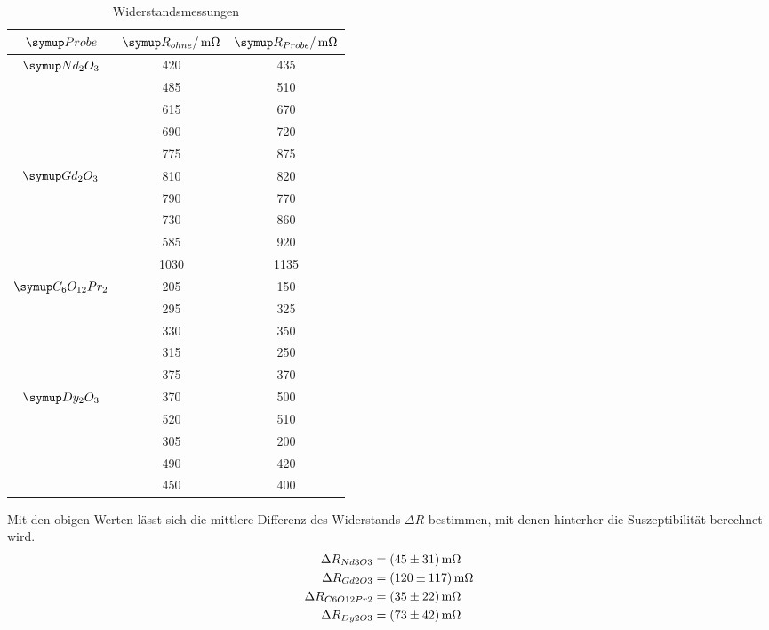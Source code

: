\begin{table}
  \centering
  \begin{tabular}{c c c}
    \toprule
    $\su{Probe}$ & $\su{R_{ohne}/\mOhm}$ &$\su{R_{Probe}}/\mOhm$ \\
    \midrule
    $\su{Nd_2O_3}$   & 420 & 435 \\
                     & 485 & 510 \\
                     & 615 & 670 \\
                     & 690 & 720 \\
                     & 775 & 875 \\ \hline
    $\su{Gd_2O_3}$   & 810 & 820 \\
                     & 790 & 770 \\
                     & 730 & 860 \\
                     & 585 & 920 \\
                     &1030 &1135 \\ \hline
    $\su{C_6O_{12}Pr_2}$  & 205 & 150 \\
                          & 295 & 325 \\
                          & 330 & 350 \\
                          & 315 & 250 \\
                          & 375 & 370 \\ \hline
    $\su{Dy_2O_3}$   & 370 & 500 \\
                     & 520 & 510 \\
                     & 305 & 200 \\
                     & 490 & 420 \\
                     & 450 & 400 \\
    \bottomrule
  \end{tabular}
  \caption{Widerstandsmessungen}
  \label{tab:mess2}
\end{table}
Mit den obigen Werten lässt sich die mittlere Differenz des Widerstands
$\Delta R$ bestimmen, mit denen hinterher die Suszeptibilität berechnet wird.
\begin{align*}
  \Delta R_{Nd3O3}    &= ( 45 \pm  31) \,\si{\milli\ohm} \\
  \Delta R_{Gd2O3}    &= (120 \pm 117) \,\si{\milli\ohm} \\
  \Delta R_{C6O12Pr2} &= ( 35 \pm  22) \,\si{\milli\ohm} \\
  \Delta R_{Dy2O3}    &= ( 73 \pm  42) \,\si{\milli\ohm}
\end{align*}
